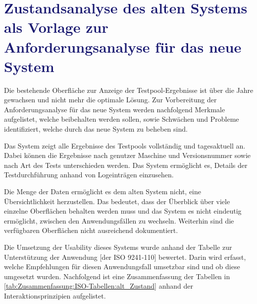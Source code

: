 \section{\textcolor{MidnightBlue}{Zustandsanalyse des alten Systems als Vorlage zur Anforderungsanalyse für das neue System}}
\label{ch:IST-Zustand:sec:Zustandsanalyse}

Die bestehende Oberfläche zur Anzeige der Testpool-Ergebnisse ist über die Jahre gewachsen und nicht mehr die optimale Lösung. Zur Vorbereitung der Anforderungsanalyse für das neue System werden nachfolgend Merkmale aufgelistet, welche beibehalten werden sollen, sowie Schwächen und Probleme identifiziert, welche durch das neue System zu beheben sind.

Das System zeigt alle Ergebnisse des Testpools vollständig und tagesaktuell an. Dabei können die Ergebnisse nach genutzer Maschine und Versionsnummer sowie nach Art des Tests unterschieden werden. Das System ermöglicht es, Details der Testdurchführung anhand von Logeinträgen einzusehen.

Die Menge der Daten ermöglicht es dem alten System nicht, eine Übersichtlichkeit herzustellen. Das bedeutet, dass der Überblick über viele einzelne Oberflächen behalten werden muss und das System es nicht eindeutig ermöglicht, zwischen den Anwendungsfällen zu wechseln. Weiterhin sind die verfügbaren Oberflächen nicht ausreichend dokumentiert.


Die Umsetzung der Usability dieses Systems wurde anhand der \glqq Tabelle zur Unterstützung der Anwendung [der ISO 9241-110]\grqq{} \cite{DIN_EN_ISO_9241-110} bewertet. 
Darin wird erfasst, welche Empfehlungen für diesen Anwendungsfall umsetzbar sind und ob diese umgesetzt wurden. Nachfolgend ist eine Zusammenfassung der Tabellen in \autoref{tab:Zusammenfassung:ISO-Tabellen:alt_Zustand} anhand der Interaktionsprinzipien aufgelistet.

